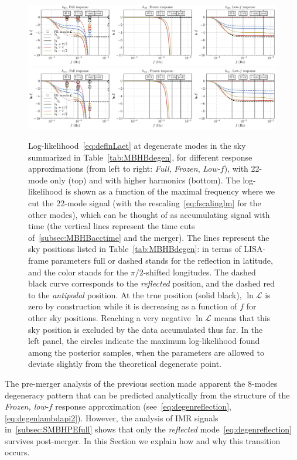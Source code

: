 \documentclass[aps,showpacs,twocolumn,prd,superscriptaddress,nofootinbib]{revtex4-1}
\newcommand\calL{{\mathcal{L}}}
\begin{document}
\begin{figure}
  \centering
  \includegraphics[width=.99\linewidth]{lnL_skymodes_approx_22.pdf}
  \includegraphics[width=.99\linewidth]{lnL_skymodes_approx_hm.pdf}
  \caption{Log-likelihood~\eqref{eq:deflnLaet} at degenerate modes in the sky summarized in Table~\ref{tab:MBHBdegen}, for different response approximations (from left to right: \textit{Full}, \textit{Frozen}, \textit{Low-$f$}), with 22-mode only (top) and with higher harmonics (bottom). The log-likelihood is shown as a function of the maximal frequency where we cut the 22-mode signal (with the rescaling~\eqref{eq:fscalinglm} for the other modes), which can be thought of as accumulating signal with time (the vertical lines represent the time cuts of~\ref{subsec:MBHBacctime} and the merger). The lines represent the sky positions listed in Table~\ref{tab:MBHBdegen}: in terms of LISA-frame parameters full or dashed stands for the reflection in latitude, and the color stands for the $\pi/2$-shifted longitudes. The dashed black curve corresponds to the \textit{reflected} position, and the dashed red to the \textit{antipodal} position. At the true position (solid black), $\ln\calL$ is zero by construction while it is decreasing as a function of $f$ for other sky positions. Reaching a very negative $\ln\calL$ means that this sky position is excluded by the data accumulated thus far. In the left panel, the circles indicate the maximum log-likelihood found among the posterior samples, when the parameters are allowed to deviate slightly from the theoretical degenerate point.}
  \label{fig:lnLskymodesapprox}
\end{figure}

The pre-merger analysis of the previous section made apparent the 8-modes degeneracy pattern that can be predicted analytically from the structure of the \textit{Frozen, low-$f$} response approximation (see~\eqref{eq:degenreflection}, \eqref{eq:degenlambdapi2}).
However, the analysis of IMR signals in~\ref{subsec:SMBHPEfull} shows that only the \textit{reflected} mode~\eqref{eq:degenreflection} survives post-merger. In this Section we explain how and why this transition occurs.
\end{document}
